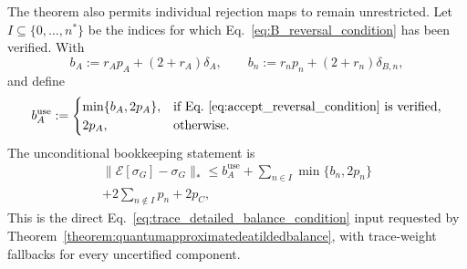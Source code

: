 \documentclass[aps,floatfix,10pt,amssymb,amsfont,amsmath,superscriptaddress,float,nofootinbib,longbibliography,nobalancelastpage,twocolumn]{revtex4-2}
\begin{document}
\begin{widetext}
The theorem also permits individual rejection maps to remain unrestricted.
Let $I\subseteq\{0,\ldots,n^*\}$ be the indices for which
Eq.~\eqref{eq:B_reversal_condition} has been verified.  With
\begin{equation*}
 b_A:=r_Ap_A+(2+r_A)\delta_A,\qquad
 b_n:=r_np_n+(2+r_n)\delta_{B,n},
\end{equation*}
and define
\begin{equation*}
 b_A^{\mathrm{use}}:=
 \begin{cases}
   \min\{b_A,2p_A\},&
   \text{if Eq.~\eqref{eq:accept_reversal_condition} is verified},\\
   2p_A,&\text{otherwise}.
 \end{cases}
\end{equation*}
The unconditional bookkeeping statement is
\begin{multline}
 \|\mathcal E[\sigma_G]-\sigma_G\|_*
 \leq b_A^{\mathrm{use}}
 +\sum_{n\in I}\min\{b_n,2p_n\}\\
 +2\sum_{n\notin I}p_n+2p_C,
 \label{eq:certified_and_exceptional_bound}
\end{multline}
This is the direct Eq.~\eqref{eq:trace_detailed_balance_condition}
input requested by Theorem~\ref{theorem:quantumapproximatedeatildedbalance},
with trace-weight fallbacks for every uncertified component.


\end{widetext}
\end{document}
